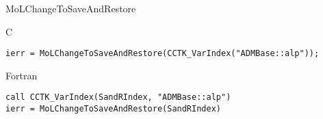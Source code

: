 \begin{FunctionDescription}{MoLChangeToSaveAndRestore}
  \begin{ExampleSection}
    \begin{Example}{C}
\begin{verbatim}
ierr = MoLChangeToSaveAndRestore(CCTK_VarIndex("ADMBase::alp"));
\end{verbatim}
    \end{Example}
    \begin{Example}{Fortran}
\begin{verbatim}
call CCTK_VarIndex(SandRIndex, "ADMBase::alp")
ierr = MoLChangeToSaveAndRestore(SandRIndex)
\end{verbatim}
    \end{Example}
  \end{ExampleSection}

\end{FunctionDescription}



